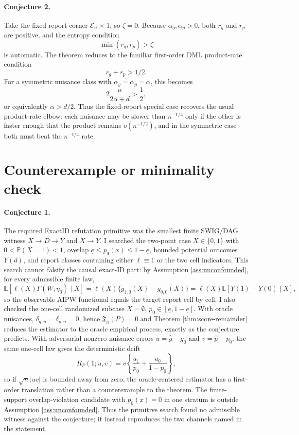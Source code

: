 \documentclass[11pt]{article}
\newcommand{\E}{\mathbb{E}}
\renewcommand{\Pr}{\mathbb{P}}
\theoremstyle{definition}
\theoremstyle{plain}
\theoremstyle{remark}
\begin{document}
\paragraph{Conjecture 2.}
Take the fixed-report corner \(\mathcal{E}_n\asymp1\), so \(\zeta=0\).  Because
\(\alpha_g,\alpha_p>0\), both \(r_g\) and \(r_p\) are positive, and the entropy
condition
\[
\min(r_g,r_p)>\zeta
\]
is automatic.  The theorem reduces to the familiar first-order DML
product-rate condition
\[
r_g+r_p>1/2.
\]
For a symmetric nuisance class with \(\alpha_g=\alpha_p=\alpha\), this becomes
\[
2\frac{\alpha}{2\alpha+d}>\frac12,
\]
or equivalently \(\alpha>d/2\).  Thus the fixed-report special case recovers
the usual product-rate elbow: each nuisance may be slower than \(n^{-1/4}\)
only if the other is faster enough that the product remains \(o(n^{-1/2})\),
and in the symmetric case both must beat the \(n^{-1/4}\) rate.

\section{Counterexample or minimality check}
\paragraph{Conjecture 1.}
The required ExactID refutation primitive was the smallest finite SWIG/DAG
witness \(X\to D\to Y\) and \(X\to Y\).  I searched the two-point case
\(X\in\{0,1\}\) with \(0<\Pr(X=1)<1\), overlap
\(\underline e\le p_0(x)\le1-\underline e\), bounded potential outcomes
\(Y(d)\), and report classes containing either \(\ell\equiv1\) or the two cell
indicators.  This search cannot falsify the causal exact-ID part: by
Assumption \ref{ass:unconfounded}, for every admissible finite law,
\[
\E[\ell(X)\Gamma(W;\eta_0)\mid X]
=\ell(X)\{g_{1,0}(X)-g_{0,0}(X)\}
=\ell(X)\E[Y(1)-Y(0)\mid X],
\]
so the observable AIPW functional equals the target report cell by cell.  I
also checked the one-cell randomized subcase \(X=\emptyset\), \(p_0\in
[\underline e,1-\underline e]\).  With oracle nuisances, \(\delta_{g,n}=
\delta_{p,n}=0\), hence \(\mathfrak{F}_n(P)=0\) and Theorem
\ref{thm:score-remainder} reduces the estimator to the oracle empirical
process, exactly as the conjecture predicts.  With adversarial nonzero nuisance
errors \(u=\hat g-g_0\) and \(v=\hat p-p_0\), the same one-cell law gives the
deterministic drift
\[
R_P(1;u,v)
=v\left\{\frac{u_1}{p_0}+\frac{u_0}{1-p_0}\right\},
\]
so if \(\sqrt n|uv|\) is bounded away from zero, the oracle-centered estimator
has a first-order translation rather than a counterexample to the theorem.  The
finite-support overlap-violation candidate with \(p_0(x)=0\) in one stratum is
outside Assumption \ref{ass:unconfounded}.  Thus the primitive search found no
admissible witness against the conjecture; it instead reproduces the two
channels named in the statement.
\end{document}
